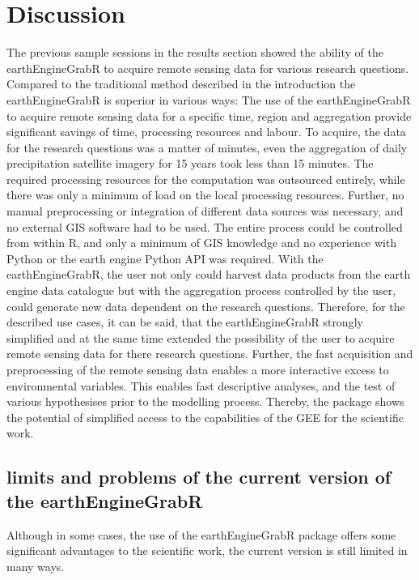 \chapter{Discussion}


The previous sample sessions in the results section showed the ability of the earthEngineGrabR to acquire remote sensing data for various research questions.
Compared to the traditional method described in the introduction the earthEngineGrabR is superior in various ways:
The use of the earthEngineGrabR to acquire remote sensing data for a specific time, region and aggregation provide significant savings of time, processing resources and labour. To acquire, the data for the research questions was a matter of minutes, even the aggregation of daily precipitation satellite imagery for 15 years took less than 15 minutes. The required processing resources for the computation was outsourced entirely, while there was only a minimum of load on the local processing resources. Further, no manual preprocessing or integration of different data sources was necessary, and no external GIS software had to be used. The entire process could be controlled from within R, and only a minimum of GIS knowledge and no experience with Python or the earth engine Python API was required. With the earthEngineGrabR, the user not only could harvest data products from the earth engine data catalogue but with the aggregation process controlled by the user, could generate new data dependent on the research questions. 
Therefore, for the described use cases, it can be said, that the earthEngineGrabR strongly simplified and at the same time extended the possibility of the user to acquire remote sensing data for there research questions. Further, the fast acquisition and preprocessing of the remote sensing data enables a more interactive excess to environmental variables.
This enables fast descriptive analyses, and the test of various hypothesises prior to the modelling process.
Thereby, the package shows the potential of simplified access to the capabilities of the GEE for the scientific work.



\section{limits and problems of the current version of the earthEngineGrabR}

Although in some cases, the use of the earthEngineGrabR package offers some significant advantages to the scientific work, the current version is still limited in many ways. 

